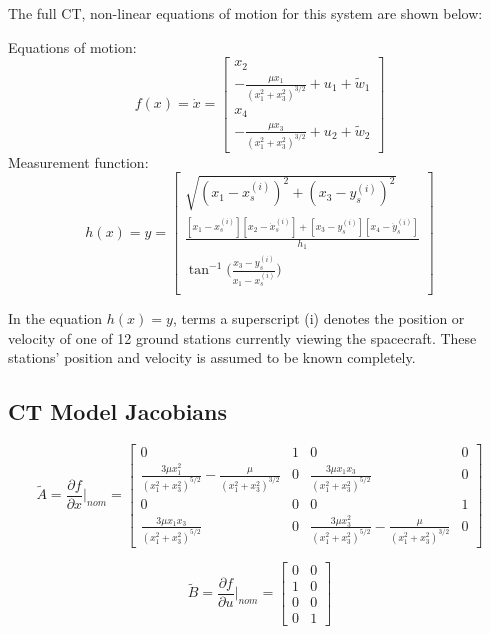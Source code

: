 \documentclass[11pt, a4paper]{article}
\begin{document}
The full CT, non-linear equations of motion for this system are shown below:


Equations of motion:
$$
f(x) = \dot{x} = 
\left[\begin{matrix}
x_2 \\
-\frac{\mu x_1}{(x_1^2 + x_3^2)^{3/2}} + u_1 + \tilde{w}_1 \\
x_4 \\
-\frac{\mu x_3}{(x_1^2 + x_3^2)^{3/2}} + u_2 + \tilde{w}_2
\end{matrix}\right]
$$
\indent Measurement function:
$$
h(x) = y = 
\left[\begin{matrix}
\sqrt{(x_1 - x^{(i)}_s)^2 + (x_3 - y^{(i)}_s)^2}\\
\frac{\left[x_1 - x^{(i)}_s\right]\left[x_2 - \dot{x}^{(i)}_s\right] + \left[x_3 - y^{(i)}_s\right]\left[x_4 - \dot{y}^{(i)}_s\right]}{h_1} \\
\tan^{-1}\big(\frac{x_3 - y^{(i)}_s}{x_1 - x^{(i)}_s} \big)\\
\end{matrix}\right]
$$

In the equation $h(x) = y$, terms a superscript (i) denotes the position or velocity of one of 12 ground stations currently viewing the spacecraft. 
These stations' position and velocity is assumed to be known completely.


\subsection{CT Model Jacobians}

$$
\tilde{A} = \frac{\partial f}{\partial x} \biggr\rvert_{nom} = 
\left[\begin{matrix}0 & 1 & 0 & 0\\\frac{3\mu x_{1}^{2}}{\left(x_{1}^{2} + x_{3}^{2}\right)^{5/2}} - \frac{\mu}{\left(x_{1}^{2} + x_{3}^{2}\right)^{3/2}} & 0 & \frac{3\mu x_{1} x_{3}}{\left(x_{1}^{2} + x_{3}^{2}\right)^{5/2}} & 0\\0 & 0 & 0 & 1\\\frac{3\mu x_{1} x_{3}}{\left(x_{1}^{2} + x_{3}^{2}\right)^{5/2}} & 0 & \frac{3\mu x_{3}^{2}}{\left(x_{1}^{2} + x_{3}^{2}\right)^{5/2}} - \frac{\mu}{\left(x_{1}^{2} + x_{3}^{2}\right)^{3/2}} & 0\end{matrix}\right]
$$

$$
\tilde{B} = \frac{\partial f}{\partial u} \biggr\rvert_{nom} = 
\left[\begin{matrix}0 & 0\\1 & 0\\0 & 0\\0 & 1\end{matrix}\right]
$$
\end{document}
